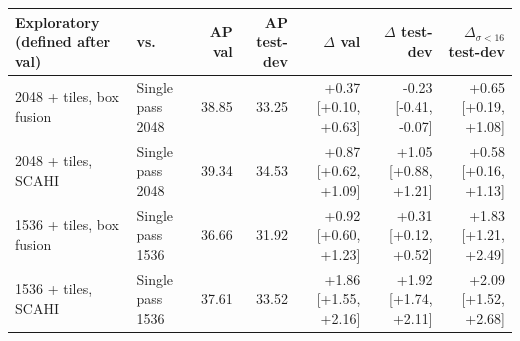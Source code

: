 \begin{tabular}{llrrrrr}
\toprule
Exploratory (defined after val) & vs. & AP val & AP test-dev & $\Delta$ val & $\Delta$ test-dev & $\Delta_{\sigma<16}$ test-dev \\
\midrule
2048 + tiles, box fusion & Single pass 2048 & 38.85 & 33.25 & +0.37 {\scriptsize[+0.10, +0.63]} & -0.23 {\scriptsize[-0.41, -0.07]} & +0.65 {\scriptsize[+0.19, +1.08]} \\
2048 + tiles, SCAHI & Single pass 2048 & 39.34 & 34.53 & +0.87 {\scriptsize[+0.62, +1.09]} & +1.05 {\scriptsize[+0.88, +1.21]} & +0.58 {\scriptsize[+0.16, +1.13]} \\
1536 + tiles, box fusion & Single pass 1536 & 36.66 & 31.92 & +0.92 {\scriptsize[+0.60, +1.23]} & +0.31 {\scriptsize[+0.12, +0.52]} & +1.83 {\scriptsize[+1.21, +2.49]} \\
1536 + tiles, SCAHI & Single pass 1536 & 37.61 & 33.52 & +1.86 {\scriptsize[+1.55, +2.16]} & +1.92 {\scriptsize[+1.74, +2.11]} & +2.09 {\scriptsize[+1.52, +2.68]} \\
\bottomrule
\end{tabular}
